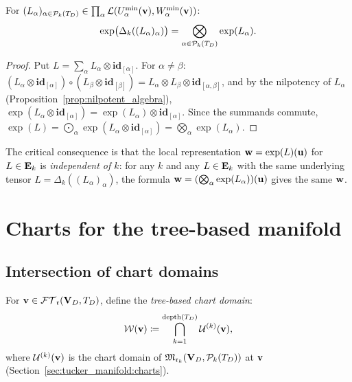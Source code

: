 \begin{proposition}
\label{prop:laplacian_exp}
For $(L_\alpha)_{\alpha \in \mathcal{P}_{k}(T_D)} \in \prod_\alpha
\mathcal{L}(U^{\min}_{\alpha}(\mathbf{v}), W^{\min}_{\alpha}(\mathbf{v}))$:
\begin{equation}
\label{eq:exp_laplacian}
    \exp\bigl(\Delta_k((L_\alpha)_\alpha)\bigr)
    = \bigotimes_{\alpha \in \mathcal{P}_{k}(T_D)} \exp(L_\alpha).
\end{equation}
\end{proposition}

\begin{proof}
Put $L = \sum_\alpha L_\alpha \otimes \mathbf{id}_{[\alpha]}$.
For $\alpha \neq \beta$:
$(L_\alpha \otimes \mathbf{id}_{[\alpha]}) \circ
(L_\beta \otimes \mathbf{id}_{[\beta]}) =
L_\alpha \otimes L_\beta \otimes \mathbf{id}_{[{\alpha,\beta}]}$,
and by the nilpotency of $L_\alpha$ (Proposition~\ref{prop:nilpotent_algebra}),
$\exp(L_\alpha \otimes \mathbf{id}_{[\alpha]}) = \exp(L_\alpha) \otimes
\mathbf{id}_{[\alpha]}$. Since the summands commute,
$\exp(L) = \bigodot_\alpha \exp(L_\alpha \otimes \mathbf{id}_{[\alpha]})
= \bigotimes_\alpha \exp(L_\alpha)$.
\end{proof}

The critical consequence is that the local representation
$\mathbf{w} = \exp(L)(\mathbf{u})$ for $L \in \mathbf{E}_{k}$ is
\emph{independent of $k$}: for any $k$ and any $L \in \mathbf{E}_{k}$
with the same underlying tensor $L = \Delta_k((L_\alpha)_\alpha)$,
the formula $\mathbf{w} = (\bigotimes_\alpha \exp(L_\alpha))(\mathbf{u})$ gives
the same $\mathbf{w}$.

\section{Charts for the tree-based manifold}
\label{sec:TB_manifold:charts}

\subsection*{Intersection of chart domains}

For $\mathbf{v} \in \mathcal{FT}_{\mathfrak{r}}(\mathbf{V}_D,T_D)$, define the \emph{tree-based chart domain}:
\begin{equation}
\label{eq:TBT_chart_domain}
    \mathcal{W}(\mathbf{v}) \coloneqq
    \bigcap_{k=1}^{\mathrm{depth}(T_D)} \mathcal{U}^{(k)}(\mathbf{v}),
\end{equation}
where $\mathcal{U}^{(k)}(\mathbf{v})$ is the chart domain of
$\mathfrak{M}_{\mathfrak{r}_k}(\mathbf{V}_D, \mathcal{P}_{k}(T_D))$ at $\mathbf{v}$
(Section~\ref{sec:tucker_manifold:charts}).

